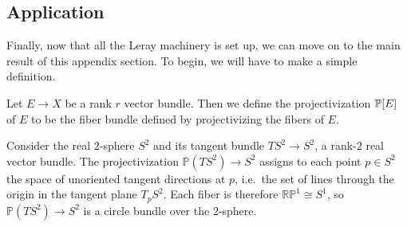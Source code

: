 \subsection{Application}
Finally, now that all the Leray machinery is set up, we can move on to the main result of this appendix section. To begin, we will have to make a simple definition.
\begin{definition}
Let $E\to X$ be a rank $r$ vector bundle. Then we define the projectivization $\P[E]$ of $E$ to be the fiber bundle defined by projectivizing the fibers of $E$. 
\end{definition}

\begin{example}
      Consider the real $2$-sphere $S^2$ and its tangent bundle 
$TS^2 \to S^2$, a rank-$2$ real vector bundle. The 
projectivization $\mathbb{P}(TS^2) \to S^2$ assigns to each 
point $p \in S^2$ the space of unoriented tangent directions 
at $p$, i.e.\ the set of lines through the origin in the 
tangent plane $T_p S^2$. Each fiber is therefore 
$\mathbb{RP}^1 \cong S^1$, so $\mathbb{P}(TS^2) \to S^2$ is 
a circle bundle over the $2$-sphere.
\end{example}

